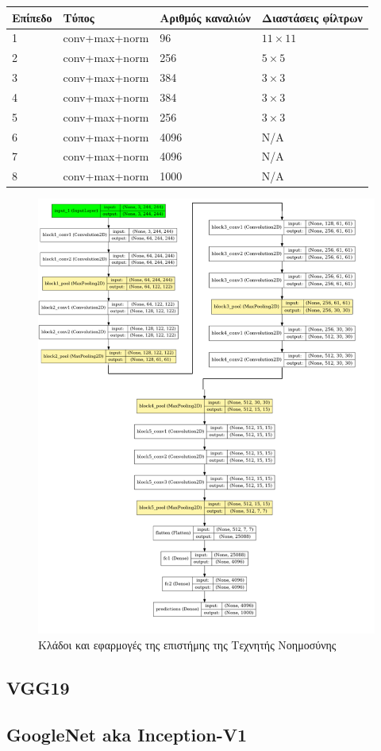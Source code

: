 \begin{tabular}{ | l | l | l | l | }
  \hline
  \rowcolor{Gray}
  Επίπεδο  & Τύπος & Αριθμός καναλιών & Διαστάσεις φίλτρων \\
  \hline
  1 & conv+max+norm & 96 & $11 \times 11$ \\
  2 & conv+max+norm & 256 & $5 \times 5$ \\
  3 & conv+max+norm & 384 & $3 \times 3$ \\
  4 & conv+max+norm & 384 & $3 \times 3$ \\
  5 & conv+max+norm & 256 & $3 \times 3$ \\
  6 & conv+max+norm & 4096 & Ν/A \\
  7 & conv+max+norm & 4096 & N/A \\
  8 & conv+max+norm & 1000 & N/A \\
  \hline
\end{tabular}

\begin{figure}[!ht]
  \centering
  \includegraphics[width=1\textwidth]{./images/chapter5/vgg16.png}
  \caption[Κλάδοι και εφαρμογές της επιστήμης της Τεχνητής Νοημοσύνης]{Κλάδοι και εφαρμογές της επιστήμης της Τεχνητής Νοημοσύνης}
  \label{fig:vgg16}
\end{figure}

\subsection{VGG19}

\subsection{GoogleNet aka Inception-V1}
